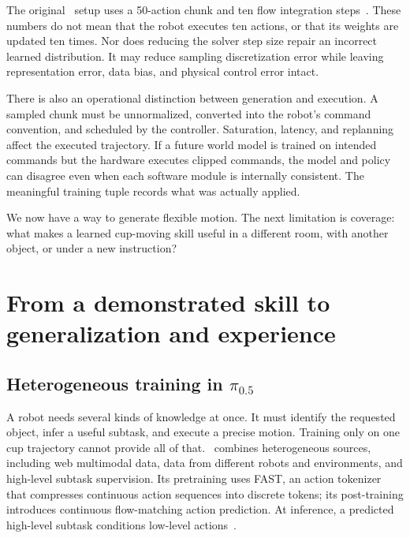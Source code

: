 The original \piz\ setup uses a 50-action chunk and ten flow integration steps~\citep{pi0}. These numbers do not mean that the robot executes ten actions, or that its weights are updated ten times. Nor does reducing the solver step size repair an incorrect learned distribution. It may reduce sampling discretization error while leaving representation error, data bias, and physical control error intact.

There is also an operational distinction between generation and execution. A sampled chunk must be unnormalized, converted into the robot's command convention, and scheduled by the controller. Saturation, latency, and replanning affect the executed trajectory. If a future world model is trained on intended commands but the hardware executes clipped commands, the model and policy can disagree even when each software module is internally consistent. The meaningful training tuple records what was actually applied.


We now have a way to generate flexible motion. The next limitation is coverage: what makes a learned cup-moving skill useful in a different room, with another object, or under a new instruction?

\section{From a demonstrated skill to generalization and experience}
\subsection{Heterogeneous training in \texorpdfstring{$\pi_{0.5}$}{pi0.5}}
A robot needs several kinds of knowledge at once. It must identify the requested object, infer a useful subtask, and execute a precise motion. Training only on one cup trajectory cannot provide all of that. \pih\ combines heterogeneous sources, including web multimodal data, data from different robots and environments, and high-level subtask supervision. Its pretraining uses FAST, an action tokenizer that compresses continuous action sequences into discrete tokens; its post-training introduces continuous flow-matching action prediction. At inference, a predicted high-level subtask conditions low-level actions~\citep{pi05}.

